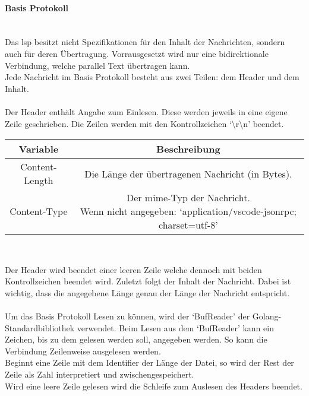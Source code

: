 \documentclass[./einleitung.tex]{subfiles}
\begin{document}
    \paragraph{Basis Protokoll}\mbox{}\\
    Das \acrshort{lsp} besitzt nicht Spezifikationen für den Inhalt der Nachrichten, sondern auch für deren Übertragung.
    Vorrausgesetzt wird nur eine bidirektionale Verbindung, welche parallel Text übertragen kann.\\
    Jede Nachricht im Basis Protokoll besteht aus zwei Teilen: dem Header und dem Inhalt.
    \\\\
    Der Header enthält Angabe zum Einlesen.
    Diese werden jeweils in eine eigene Zeile geschrieben.
    Die Zeilen werden mit den Kontrollzeichen `{\textbackslash}r{\textbackslash}n' beendet.
    \begin{center}
        \begin{tabular}{|c|c|}
            \hline
            Variable & Beschreibung \\
            \hline
            \hline
            Content-Length & Die Länge der übertragenen Nachricht (in Bytes).\\
            \hline
            Content-Type & \makecell{Der \acrshort{mime}-Typ der Nachricht.\\
            Wenn nicht angegeben: `application/vscode-jsonrpc; charset=utf-8'}\\
            \hline
        \end{tabular}
        \\
        \cite{header}
    \end{center}
    Der Header wird beendet einer leeren Zeile welche dennoch mit beiden Kontrollzeichen beendet wird.
    Zuletzt folgt der Inhalt der Nachricht.
    Dabei ist wichtig, dass die angegebene Länge genau der Länge der Nachricht entspricht.
    \\\\
    Um das Basis Protokoll Lesen zu können, wird der `BufReader' der Golang-Standardbibliothek verwendet.
    Beim Lesen aus dem `BufReader' kann ein Zeichen, bis zu dem gelesen werden soll, angegeben werden.
    So kann die Verbindung Zeilenweise ausgelesen werden.\\
    Beginnt eine Zeile mit dem Identifier der Länge der Datei, so wird der Rest der Zeile als Zahl interpretiert und zwischengespeichert.\\
    Wird eine leere Zeile gelesen wird die Schleife zum Auslesen des Headers beendet.\\
\end{document}
